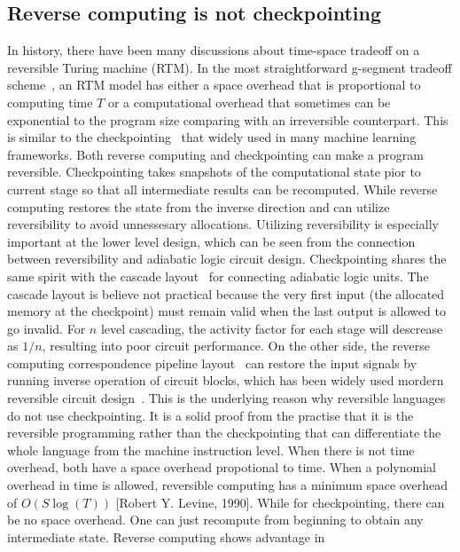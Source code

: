 \documentclass{article}
\newcommand{\<}{\langle}
\renewcommand{\>}{\rangle}
\theoremstyle{definition}\newtheorem{definition}{\textit{Definition}}
\begin{document}
\subsection{Reverse computing is not checkpointing}\label{sec:timespace}
In history, there have been many discussions about time-space tradeoff on a reversible Turing machine (RTM).
In the most straightforward g-segment tradeoff scheme~\cite{Bennett1989,Levine1990,Perumalla2013}, an RTM model has either a space overhead that is proportional to computing time $T$ or a computational overhead that sometimes can be exponential to the program size comparing with an irreversible counterpart.
This is similar to the checkpointing~\cite{Griewank2008, Chen2016} that widely used in many machine learning frameworks.
Both reverse computing and checkpointing can make a program reversible.
Checkpointing takes snapshots of the computational state pior to current stage so that all intermediate results can be recomputed.
While reverse computing restores the state from the inverse direction and can utilize reversibility to avoid unnessesary allocations.
Utilizing reversibility is especially important at the lower level design, which can be seen from the connection between reversibility and adiabatic logic circuit design.
Checkpointing shares the same spirit with the cascade layout~\cite{Hall1992} for connecting adiabatic logic units.
The cascade layout is believe not practical because the very first input (the allocated memory at the checkpoint) must remain valid when the last output is allowed to go invalid. For $n$ level cascading, the activity factor for each stage will descrease as $1/n$, resulting into poor circuit performance.
On the other side, the reverse computing correspondence pipeline layout~\cite{Athas1994} can restore the input signals by running inverse operation of circuit blocks, which has been widely used mordern reversible circuit design~\cite{Anantharam2004}.
This is the underlying reason why reversible languages do not use checkpointing.
It is a solid proof from the practise that it is the reversible programming rather than the checkpointing that can differentiate the whole language from the machine instruction level.
When there is not time overhead, both have a space overhead propotional to time.
When a polynomial overhead in time is allowed, reversible computing has a minimum space overhead of $O(S\log(T))$  [Robert Y. Levine, 1990]. While for checkpointing, there can be no space overhead. One can just recompute from beginning to obtain any intermediate state.
Reverse computing shows advantage in
\end{document}
